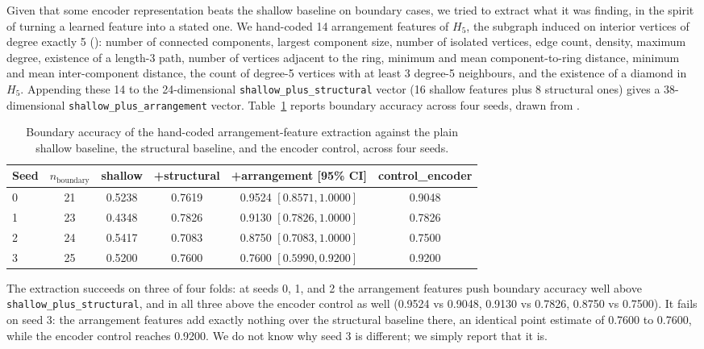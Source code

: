 Given that some encoder representation beats the shallow baseline on
boundary cases, we tried to extract what it was finding, in the spirit of
turning a learned feature into a stated one. We hand-coded 14 arrangement
features of $H_5$, the subgraph induced on interior vertices of degree
exactly 5 (): number of connected
components, largest component size, number of isolated vertices, edge
count, density, maximum degree, existence of a length-3 path, number of
vertices adjacent to the ring, minimum and mean component-to-ring
distance, minimum and mean inter-component distance, the count of
degree-5 vertices with at least 3 degree-5 neighbours, and the existence
of a diamond in $H_5$.
Appending these 14 to the 24-dimensional \texttt{shallow\_plus\_structural} vector
(16 shallow features plus 8 structural ones) gives a 38-dimensional
\texttt{shallow\_plus\_arrangement} vector. Table~\ref{tab:extraction}
reports boundary accuracy across four seeds, drawn from
.

\begin{table}[htbp]
\centering
\begin{tabular}{lccccc}
\toprule
Seed & $n_{\mathrm{boundary}}$ & shallow & +structural & +arrangement [95\% CI] & control\_encoder \\
\midrule
0 & 21 & 0.5238 & 0.7619 & 0.9524 $[0.8571, 1.0000]$ & 0.9048 \\
1 & 23 & 0.4348 & 0.7826 & 0.9130 $[0.7826, 1.0000]$ & 0.7826 \\
2 & 24 & 0.5417 & 0.7083 & 0.8750 $[0.7083, 1.0000]$ & 0.7500 \\
3 & 25 & 0.5200 & 0.7600 & 0.7600 $[0.5990, 0.9200]$ & 0.9200 \\
\bottomrule
\end{tabular}
\caption{Boundary accuracy of the hand-coded arrangement-feature extraction
against the plain shallow baseline, the structural baseline, and the
encoder control, across four seeds.}
\label{tab:extraction}
\end{table}

The extraction succeeds on three of four folds: at seeds 0, 1, and 2 the
arrangement features push boundary accuracy well above
\texttt{shallow\_plus\_structural}, and in all three above the encoder control as
well (0.9524 vs 0.9048, 0.9130 vs 0.7826, 0.8750 vs 0.7500). It fails on seed 3: the arrangement features add
exactly nothing over the structural baseline there, an identical point
estimate of 0.7600 to 0.7600, while the encoder control reaches 0.9200. We
do not know why seed 3 is different; we simply report that it is.

